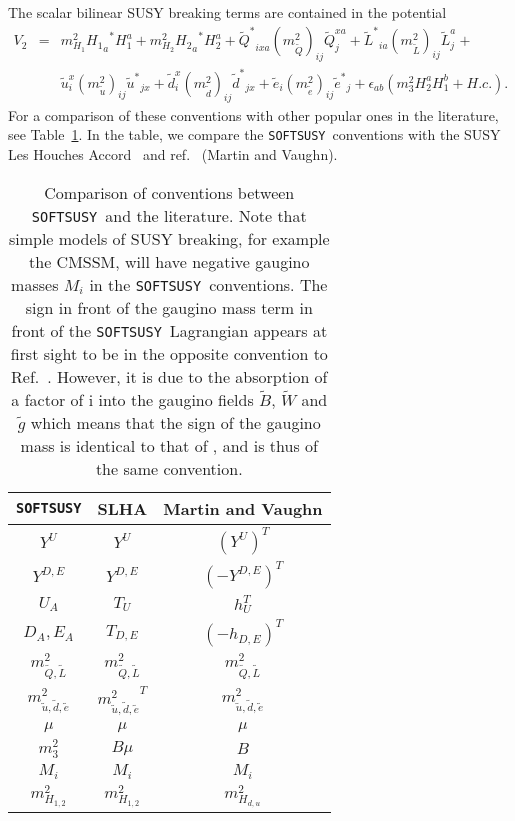 \documentclass[]{article}
\def\SOFTSUSY{{\tt SOFTSUSY}}
\begin{document}
The scalar bilinear SUSY breaking terms are contained in the potential
\begin{eqnarray}
V_2 &=& m_{H_1}^2 {{H_1}_a}^* {H_1^a} + m_{H_2}^2 {{H_2}_a}^* {H_2^a} +
{\tilde{Q}^*}_{ixa} (m_{\tilde Q}^2)_{ij} \tilde{Q}_j^{xa} +
{\tilde{L}^*}_{ia} (m_{\tilde L}^2)_{ij} \tilde{L}_j^{a}  + \nonumber \\ &&
 \tilde{u}_i^{x} (m_{\tilde u}^2)_{ij}  {\tilde{u}^*}_{jx} +
\tilde{d}_i^{x} (m_{\tilde d}^2)_{ij}  {\tilde{d}^*}_{jx} +
\tilde{e}_i (m_{\tilde e}^2)_{ij} {\tilde{e}^*}_{j} +
\epsilon_{ab} (m_3^2 H_2^a H_1^b + H.c.).
\end{eqnarray}
For a comparison of these conventions with other popular ones in the
literature, see Table~\ref{tab:conv}. In the table, we compare the
\SOFTSUSY~conventions with the 
SUSY Les Houches Accord~\cite{lhacc} and ref.~\cite{mandv} (Martin and Vaughn).
%
\begin{table}\begin{center}
\begin{tabular}{ccc}
\SOFTSUSY & SLHA & Martin and Vaughn \\ \hline
$Y^{U}$ & $Y^{U}$ & $({Y^{U}})^T$ \\
$Y^{D,E}$ & $Y^{D,E}$ & $(-{Y^{D,E}})^T$ \\
$U_A$ & $T_{U}$ & $h_{U}^T$ \\
$D_A, E_A$ & $T_{D,E}$ & $(-h_{D,E})^T$ \\
$m_{{\tilde Q},{\tilde L}}^2$ & $m_{{\tilde Q},{\tilde L}}^2$ & $m_{{\tilde
    Q},{\tilde L}}^2$ \\
$m_{{\tilde u},{\tilde d},{\tilde e}}^2$ & ${m_{{\tilde u},{\tilde d},{\tilde
    e}}^2}^T$ &
$m_{{\tilde u},{\tilde d},{\tilde e}}^2$\\
$\mu$ & $\mu$ & $\mu$ \\
$m_3^2$ & $B \mu$ & $B$  \\
$M_i$ & $M_i$ & $M_i$ \\
$m_{H_{1,2}}^2$ & $m_{H_{1,2}}^2$& $m_{H_{d,u}}^2$ \\
\end{tabular}
\caption{\label{tab:conv} Comparison of conventions between \SOFTSUSY~and the literature. Note
  that simple models of SUSY breaking, for example the CMSSM, will have
  negative gaugino masses $M_i$ in the
  \SOFTSUSY~conventions. The sign in front of the gaugino mass
    term in front of the \SOFTSUSY~Lagrangian appears at first sight to be in
    the     opposite convention 
    to Ref.~\cite{mandv}. However, it is due to the absorption of a factor of
    i into the gaugino fields $\tilde B$, $\tilde W$ and $\tilde g$ which
    means that the sign of the gaugino mass is identical to that of
    \cite{mandv}, and is thus of the same convention.}
\end{center}\end{table}
\end{document}
